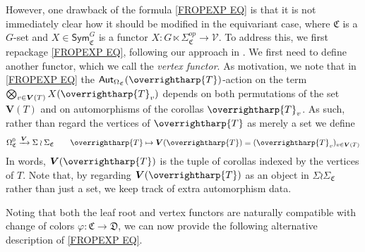 \documentclass[a4paper,10pt
]{article}%
\numberwithin{equation}{section}
\numberwithin{figure}{section}
\theoremstyle{definition} %
\newcommand{\vect}[1]{\text{\overrightharp{\ensuremath{#1}}}}
\newcommand{\V}{\ensuremath{\mathcal V}}
\newcommand{\1}{\ensuremath{\mathbbm 1}}%
\begin{document}
However, one drawback of the formula  
\eqref{FROPEXP EQ}
is that it is not immediately clear how it should be modified 
in the equivariant case,
where $\mathfrak{C}$ is a $G$-set
and $X \in \mathsf{Sym}^G_{\mathfrak{C}}$
is a functor 
$X \colon G \ltimes \Sigma_{\mathfrak{C}}^{op} \to \V$.
To address this, we first repackage \eqref{FROPEXP EQ}, 
following our approach in \cite[\S 4]{BP21}.
We first need to define another functor, which we call the \emph{vertex functor}.
As motivation, we note that
in \eqref{FROPEXP EQ}
the $\mathsf{Aut}_{\Omega_{\mathfrak{C}}}(\vect{T})$-action
on the term
$\bigotimes_{v \in \boldsymbol{V}(T)} X(\vect{T}_v)$
depends on both permutations 
of the set $\boldsymbol{V}(T)$
and on automorphisms of the corollas $\vect{T}_v$.
As such, rather than regard the vertices of $\vect{T}$ as merely a set
we define 
\begin{equation}\label{VFUNDEF EQ}
\Omega_{\mathfrak{C}}^0 \xrightarrow{\boldsymbol{V}} \Sigma \wr \Sigma_{\mathfrak{C}}
\qquad 
\vect{T} \mapsto 
\boldsymbol{V}(\vect{T})=(\vect{T}_v )_{v \in \boldsymbol{V}(T)}
\end{equation}
In words, $\boldsymbol{V}(\vect{T})$
is the tuple of corollas indexed by the vertices of $T$. 
Note that,
by regarding $\boldsymbol{V}(\vect{T})$ as an object in 
$\Sigma \wr \Sigma_{\mathfrak{C}}$ rather than just a set,
we keep track of extra automorphism data.

Noting that both the leaf root and vertex functors are naturally compatible with change of colors 
$\varphi \colon \mathfrak{C} \to \mathfrak{D}$, 
we can now provide the following alternative 
description of \eqref{FROPEXP EQ}.
\end{document}
